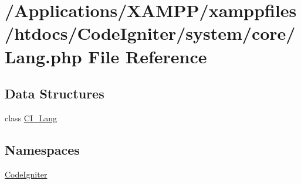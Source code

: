 \hypertarget{_lang_8php}{}\section{/\+Applications/\+X\+A\+M\+P\+P/xamppfiles/htdocs/\+Code\+Igniter/system/core/\+Lang.php File Reference}
\label{_lang_8php}
\subsection*{Data Structures}
\begin{DoxyCompactItemize}
\item 
class \mbox{\hyperlink{class_c_i___lang}{C\+I\+\_\+\+Lang}}
\end{DoxyCompactItemize}
\subsection*{Namespaces}
\begin{DoxyCompactItemize}
\item 
 \mbox{\hyperlink{namespace_code_igniter}{Code\+Igniter}}
\end{DoxyCompactItemize}
